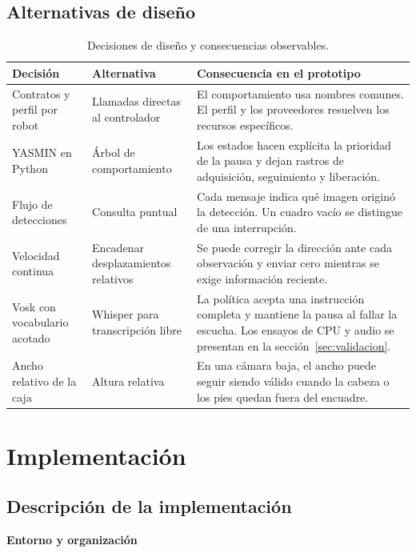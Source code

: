 \documentclass[11pt,letterpaper]{article}
\begin{document}
\subsection{Alternativas de diseño}
\begin{table}[htbp]
\centering\small
\caption{Decisiones de diseño y consecuencias observables.}
\begin{tabularx}{\linewidth}{@{}P{3.8cm}YY@{}}
\toprule
Decisión & Alternativa & Consecuencia en el prototipo \\
\midrule
Contratos y perfil por robot & Llamadas directas al controlador & El comportamiento usa nombres comunes. El perfil y los proveedores resuelven los recursos específicos. \\
YASMIN en Python & Árbol de comportamiento & Los estados hacen explícita la prioridad de la pausa y dejan rastros de adquisición, seguimiento y liberación. \\
Flujo de detecciones & Consulta puntual & Cada mensaje indica qué imagen originó la detección. Un cuadro vacío se distingue de una interrupción. \\
Velocidad continua & Encadenar desplazamientos relativos & Se puede corregir la dirección ante cada observación y enviar cero mientras se exige información reciente. \\
Vosk con vocabulario acotado & Whisper para transcripción libre & La política acepta una instrucción completa y mantiene la pausa al fallar la escucha. Los ensayos de CPU y audio se presentan en la sección~\ref{sec:validacion}. \\
Ancho relativo de la caja & Altura relativa & En una cámara baja, el ancho puede seguir siendo válido cuando la cabeza o los pies quedan fuera del encuadre. \\
\bottomrule
\end{tabularx}
\end{table}

\FloatBarrier
\clearpage
\section{Implementación}\label{sec:implementacion}
\subsection{Descripción de la implementación}

\par\medskip\noindent\textbf{Entorno y organización}\par
\end{document}
